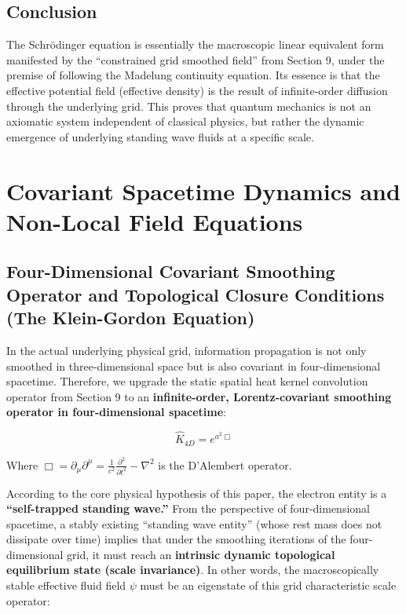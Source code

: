 \documentclass[12pt, a4paper]{article}
\begin{document}
\subsection{Conclusion}

The Schrödinger equation is essentially the macroscopic linear equivalent form manifested by the ``constrained grid smoothed field'' from Section 9, under the premise of following the Madelung continuity equation. Its essence is that the effective potential field (effective density) is the result of infinite-order diffusion through the underlying grid. This proves that quantum mechanics is not an axiomatic system independent of classical physics, but rather the dynamic emergence of underlying standing wave fluids at a specific scale.



\section{Covariant Spacetime Dynamics and Non-Local Field Equations}

\subsection{Four-Dimensional Covariant Smoothing Operator and Topological Closure Conditions (The Klein-Gordon Equation)}

In the actual underlying physical grid, information propagation is not only smoothed in three-dimensional space but is also covariant in four-dimensional spacetime. Therefore, we upgrade the static spatial heat kernel convolution operator from Section 9 to an \textbf{infinite-order, Lorentz-covariant smoothing operator in four-dimensional spacetime}:

\begin{equation}
\hat{K}_{4D} = e^{a^2\Box}
\end{equation}

Where $\Box = \partial_\mu \partial^\mu = \frac{1}{c^2}\frac{\partial^2}{\partial t^2} - \nabla^2$ is the D'Alembert operator.

According to the core physical hypothesis of this paper, the electron entity is a \textbf{``self-trapped standing wave.''} 
From the perspective of four-dimensional spacetime, a stably existing ``standing wave entity'' (whose rest mass does not dissipate over time) implies that under the smoothing iterations of the four-dimensional grid, it must reach an \textbf{intrinsic dynamic topological equilibrium state (scale invariance)}. 
In other words, the macroscopically stable effective fluid field $\psi$ must be an eigenstate of this grid characteristic scale operator:
\end{document}
